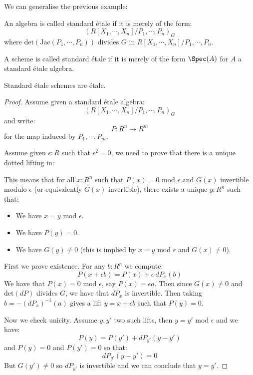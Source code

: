 We can generalise the previous example:

\begin{definition}
An algebra is called standard étale if it is merely of the form:
\[(R[X_1,\cdots,X_n]/P_1,\cdots,P_n)_G\]
where $\mathrm{det}(\mathrm{Jac}(P_1,\cdots,P_n))$ divides $G$ in $R[X_1,\cdots,X_n]/P_1,\cdots,P_n$.
\end{definition}

\begin{definition}
A scheme is called standard étale if it is merely of the form $\Spec(A)$ for $A$ a standard étale algebra.
\end{definition}

\begin{lemma}\label{standard-etale-are-etale}
Standard étale schemes are étale.
\end{lemma}

\begin{proof}
Assume given a standard étale algebra:
\[(R[X_1,\cdots,X_n]/P_1,\cdots,P_n)_G\]
and write:
\[P:R^n\to R^m\]
for the map induced by $P_1,\cdots,P_m$.

Assume given $\epsilon:R$ such that $\epsilon^2=0$, we need to prove that there is a unique dotted lifting in:
  \begin{center}
    \end{center}
This means that for all $x:R^n$ such that $P(x)=0$ mod $\epsilon$ and $G(x)$ invertible modulo $\epsilon$ (or equivalently $G(x)$ invertible), there exists a unique $y:R^n$ such that:
\begin{itemize} 
\item We have $x=y$ mod $\epsilon$.
\item We have $P(y)=0$.
\item We have $G(y)\not=0$ (this is implied by $x=y$ mod $\epsilon$ and $G(x)\not=0$).
\end{itemize}

First we prove existence. For any $b:R^n$ we compute:
\[P(x+\epsilon b) = P(x) + \epsilon\ dP_x(b)\]
We have that $P(x)=0$ mod $\epsilon$, say $P(x) = \epsilon a$. Then since $G(x)\not=0$ and $\mathrm{det}(dP)$ divides $G$, we have that $dP_x$ is invertible. Then taking $b = -(dP_x)^{-1}(a)$ gives a lift $y=x+\epsilon b$ such that $P(y) = 0$.

Now we check unicity. Assume $y,y'$ two such lifts, then $y=y'$ mod $\epsilon$ and we have:
\[P(y) = P(y') + dP_{y'}(y-y')\]
and $P(y)=0$ and $P(y')=0$ so that:
\[dP_{y'}(y-y') = 0\]
But $G(y')\not=0$ so $dP_{y'}$ is invertible and we can conclude that $y=y'$.
\end{proof}

